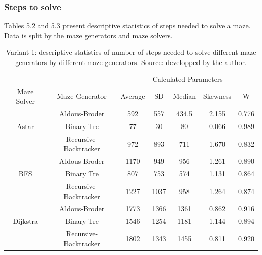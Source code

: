\subsubsection{Steps to solve}
Tables 5.2 and 5.3 present descriptive statistics of steps needed to solve a maze. Data is split by the maze generators and maze solvers. 
\begin{table}[!ht]
    \centering
    \caption{Variant 1: descriptive statistics of number of steps needed to solve different maze generators by different maze generators. Source: developped by the author.} 
    \begin{tabular}{c c c c c c c}
    \hline
        ~&~&\multicolumn{5}{c}{Calculated Parameters}\\
        Maze Solver & Maze Generator & Average & SD & Median & Skewness & W\\ \hline \hline
        ~ & Aldous-Broder & 592 & 557 & 434.5 & 2.155 & 0.776\\ 
        Astar & Binary Tre & 77 & 30 & 80 & 0.066 & 0.989 \\ 
        ~ & Recursive-Backtracker & 972 & 893 & 711 & 1.670 & 0.832\\ \hline
        ~ & Aldous-Broder & 1170 & 949 & 956 & 1.261 & 0.890\\ 
        BFS & Binary Tre & 807 & 753 & 574 & 1.131 & 0.864\\ 
        ~ & Recursive-Backtracker & 1227 & 1037 & 958 & 1.264 & 0.874\\ \hline
        ~ & Aldous-Broder & 1773 & 1366 & 1361 & 0.862 & 0.916\\ 
        Dijkstra & Binary Tre & 1546 & 1254 & 1181 & 1.144 & 0.894\\ 
        ~ & Recursive-Backtracker & 1802 & 1343 & 1455 & 0.811 & 0.920\\ \hline
    \end{tabular}
\end{table}
